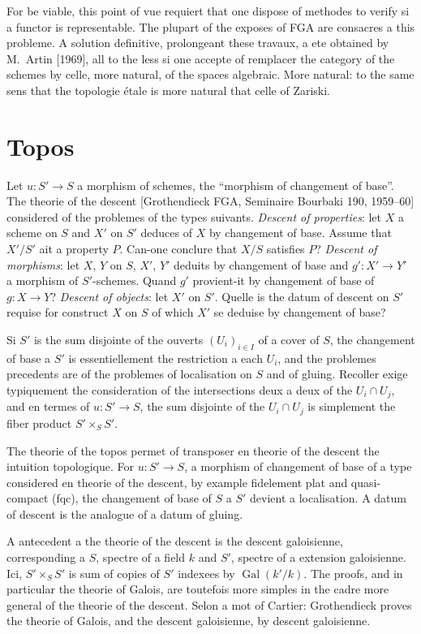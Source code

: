 \documentclass[11pt,a4paper]{article}
\theoremstyle{plain}
\theoremstyle{definition}
\DeclareMathOperator{\Gal}{Gal}
\begin{document}
For be viable, this point of vue requiert that one dispose of methodes to verify si a functor is representable. The plupart of the exposes of FGA are consacres a this probleme. A solution definitive, prolongeant these travaux, a ete obtained by M.~Artin [1969], all to the less si one accepte of remplacer the category of the schemes by celle, more natural, of the spaces algebraic. More natural: to the same sens that the topologie étale is more natural that celle of Zariski.

\section{Topos}

Let $u \colon S' \to S$ a morphism of schemes, the ``morphism of changement of base''. The theorie of the descent [Grothendieck FGA, Seminaire Bourbaki 190, 1959--60] considered of the problemes of the types suivants. \emph{Descent of properties}: let $X$ a scheme on $S$ and $X'$ on $S'$ deduces of $X$ by changement of base. Assume that $X'/S'$ ait a property $P$. Can-one conclure that $X/S$ satisfies $P$? \emph{Descent of morphisms}: let $X$, $Y$ on $S$, $X'$, $Y'$ deduits by changement of base and $g' \colon X' \to Y'$ a morphism of $S'$-schemes. Quand $g'$ provient-it by changement of base of $g \colon X \to Y$? \emph{Descent of objects}: let $X'$ on $S'$. Quelle is the datum of descent on $S'$ requise for construct $X$ on $S$ of which $X'$ se deduise by changement of base?

Si $S'$ is the sum disjointe of the ouverts $(U_i)_{i \in I}$ of a cover of $S$, the changement of base a $S'$ is essentiellement the restriction a each $U_i$, and the problemes precedents are of the problemes of localisation on $S$ and of gluing. Recoller exige typiquement the consideration of the intersections deux a deux of the $U_i \cap U_j$, and en termes of $u \colon S' \to S$, the sum disjointe of the $U_i \cap U_j$ is simplement the fiber product $S' \times_S S'$.

The theorie of the topos permet of transposer en theorie of the descent the intuition topologique. For $u \colon S' \to S$, a morphism of changement of base of a type considered en theorie of the descent, by example fidelement plat and quasi-compact (fqc), the changement of base of $S$ a $S'$ devient a localisation. A datum of descent is the analogue of a datum of gluing.

A antecedent a the theorie of the descent is the descent galoisienne, corresponding a $S$, spectre of a field $k$ and $S'$, spectre of a extension galoisienne. Ici, $S' \times_S S'$ is sum of copies of $S'$ indexees by $\Gal(k'/k)$. The proofs, and in particular the theorie of Galois, are toutefois more simples in the cadre more general of the theorie of the descent. Selon a mot of Cartier: Grothendieck proves the theorie of Galois, and the descent galoisienne, by descent galoisienne.
\end{document}
